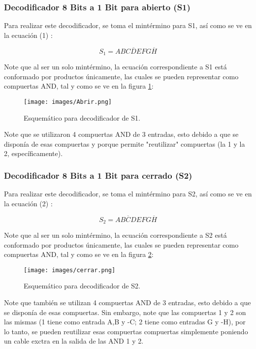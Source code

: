 \documentclass[conference]{IEEEtran}  %
\begin{document}
\subsubsection{Decodificador 8 Bits a 1 Bit para abierto (S1)}

Para realizar este decodificador, se toma el mintérmino para S1, así como se ve en la ecuación (1) :

\begin{equation}
S_1 = AB\overline{CDE}FG\overline{H}
\end{equation}

Note que al ser un solo mintérmino, la ecuación correspondiente a S1 está conformado por productos únicamente, las cuales se pueden representar como compuertas AND, tal y como se ve en la figura \ref{fig:s1}:

\begin{figure}[h]
    \centering
    \texttt{[image: images/Abrir.png]}
    \caption{Esquemático para decodificador de S1.}
    \label{fig:s1}
\end{figure}

Note que se utilizaron 4 compuertas AND de 3 entradas, esto debido a que se disponía de esas compuertas y porque permite "reutilizar" compuertas (la 1 y la 2, específicamente). 

\subsubsection{Decodificador 8 Bits a 1 Bit para cerrado (S2) } 

Para realizar este decodificador, se toma el mintérmino para S2, así como se ve en la ecuación (2) :

\begin{equation}
S_2 = AB\overline{C}DEFG\overline{H}
\end{equation}

Note que al ser un solo mintérmino, la ecuación correspondiente a S2 está conformado por productos únicamente, las cuales se pueden representar como compuertas AND, tal y como se ve en la figura \ref{fig:s2}:

\begin{figure}[h]
    \centering
    \texttt{[image: images/cerrar.png]}
    \caption{Esquemático para decodificador de S2.}
    \label{fig:s2}
\end{figure}

Note que también se utilizan 4 compuertas AND de 3 entradas, esto debido a que se disponía de esas compuertas. Sin embargo, note que las compuertas 1 y 2 son las mismas (1 tiene como entrada A,B y -C; 2 tiene como entradas G y -H), por lo tanto, se pueden reutilizar esas compuertas compuertas simplemente poniendo un cable exctra en la salida de las AND 1 y 2. 
\end{document}
